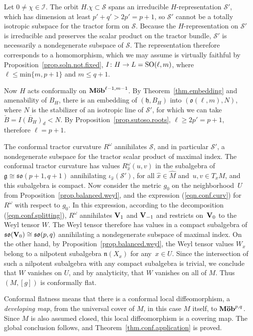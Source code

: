 \documentclass[10pt,a4paper]{amsart}
\numberwithin{equation}{section}
\theoremstyle{definition}
\newcommand{\lieh}{\mathfrak{h}}
\def\g{{\mathfrak g}}
\def\n{{\mathfrak n}}
\newcommand{\so}{\mathfrak{so}}
\newcommand{\SO}{{\rm SO}}
\begin{document}
 Let $0 \neq \chi \in \mathcal{I}$. The orbit $H.\chi \subset \mathcal{S}$ spans an irreducible $H$-representation $\mathcal{S'}$,
 which has dimension at least $p'+q' > 2 p' = p+1$, so $\mathcal{S'}$ cannot be a totally isotropic subspace for the tractor form on $\mathcal{S}$. Because the $H$-representation on $\mathcal{S}'$ is irreducible and preserves the scalar product on the tractor bundle, $\mathcal{S}'$ is necessarily a nondegenerate subspace of $\mathcal{S}$. The representation therefore corresponds to a homomorphism, which we may assume is virtually faithful by Proposition~\ref{prop.soln.not.fixed}, $I \colon H \rightarrow L = \SO(\ell, m)$, where $\ell \leq \mbox{min}\{ m, p+1 \}$ and $m \leq q+1$.

Now $H$ acts conformally on $\mbox{\bf M\"ob}^{\ell-1, m-1}$. By Theorem~\ref{thm.embedding} and amenability of $B_H$, there is
an embedding of $(\lieh, B_H)$ into $(\mathfrak{o}(\ell, m), N)$, where $N$ is the stabilizer of an isotropic line of $\mathcal{S}'$, for which we can take $\check{B} = \overline{I(B_H)}_d < N$.
By Proposition~\ref{prop.sutoso.roots}, $\ell \geq 2 p' = p+1$, therefore $\ell = p+1$.

The conformal tractor curvature $R^\omega$ annihilates $\mathcal{S}$, and in particular $\mathcal{S}'$, a nondegenerate subspace for the tractor scalar product of maximal index. The conformal tractor curvature has values $R^\omega_{\hat{x}}(u,v)$ in the subalgebra of $\g \cong \so(p+1,q+1)$ annihilating $\iota_{\hat{x}} (\mathcal{S}')$, for all $\hat{x} \in \hat{M}$ and~${u,v \in T_x M}$, and this subalgebra is compact.
 Now consider the metric $g_0$ on the neighborhood~$U$ from Proposition~\ref{prop.balanced.weyl}, and the expression (\ref{eqn.conf.curv}) for $R^\omega$ with respect to $g_0$. In this expression, according to the decomposition (\ref{eqn.conf.splitting}), $R^\omega$ annihilates ${\bf V}_{1}$ and ${\bf V}_{-1}$ and restricts on~${\bf V}_0$ to the Weyl tensor $W$. The Weyl tensor therefore has values in a compact subalgebra of $\so({\bf V}_0) \cong \so(p,q)$ annihilating a nondegenerate subspace of maximal index.
On the other hand, by Proposition~\ref{prop.balanced.weyl}, the Weyl tensor values $W_x$ belong to a nilpotent subalgebra $\n(X_x)$ for any~${x \in U}$.
Since the intersection of such a nilpotent subalgebra with any compact subalgebra is trivial, we conclude that $W$ vanishes on $U$, and by analyticity, that $W$ vanishes on all of $M$. Thus $(M,[g])$ is conformally flat.

Conformal flatness means that there is a conformal local diffeomorphism, a \emph{developing map}, from the universal cover of $M$, in this case $M$ itself, to $\mbox{\bf M\"ob}^{p,q}$. Since $M$ is also assumed closed, this local diffeomorphism is a covering map. The global conclusion follows, and Theorem~\ref{thm.conf.application} is proved.
\end{document}
